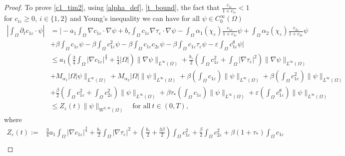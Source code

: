 \documentclass[a4paper,10pt]{article}
\theoremstyle{definition}
\begin{document}
\begin{proof}
  \noindent
  To prove \eqref{c1_tim2}, using \eqref{alpha_def}, \eqref{t_bound}, the fact that $\frac{c_{i\varepsilon}}{1 + c_{i\varepsilon}} < 1$ for $c_{i\varepsilon} \geq 0,\ i \in \{1, 2\}$ and Young's inequality we can have for all $\psi \in C_0^\infty(\Omega)$
  \begin{align}
  \label{c1_tim5}
    \nonumber \left|\int_\Omega \partial_t c_{1\varepsilon} \cdot \psi\right| & = \bigg| - a_1 \int_\Omega \nabla c_{1\varepsilon} \cdot \nabla \psi + b_\tau \int_\Omega c_{1\varepsilon} \nabla \tau_\varepsilon \cdot \nabla \psi  - \int_\Omega \alpha_1(\chi_\varepsilon)\tfrac{c_{1\varepsilon}}{1 + c_{1\varepsilon}}  \psi + \int_\Omega \alpha_2( \chi_\varepsilon) \tfrac{c_{2\varepsilon}}{1 + c_{2\varepsilon}} \psi \\[5pt]
    \nonumber &   + \beta \int_\Omega  c_{1\varepsilon}\psi -  \beta \int_\Omega  c_{1\varepsilon}^2\psi - \beta \int_\Omega  c_{1\varepsilon}   c_{2\varepsilon}\psi  - \beta \int_\Omega  c_{1\varepsilon} \tau_\varepsilon\psi  - \varepsilon \int_\Omega  c_{1\varepsilon}^\theta \psi \bigg|\\[5pt]
    \nonumber & \leq a_1 \left(\frac{3}{4} \int_\Omega |\nabla c_{1\varepsilon}|^{\frac{4}{3}} + \frac{1}{4} |\Omega|\right)\|\nabla \psi\|_{L^\infty(\Omega)} + \frac{b_\tau}{2} \left(\int_\Omega c_{1\varepsilon}^2 + \int_\Omega |\nabla \tau_\varepsilon|^2\right)\|\nabla \psi\|_{L^\infty(\Omega)} \\[5pt]
    \nonumber & + M_{\alpha_1} |\Omega| \psi\|_{L^\infty(\Omega)} +  M_{\alpha_2} |\Omega| \| \psi\|_{L^\infty(\Omega)}  + \beta \left(\int_\Omega c_{1\varepsilon}\right)\| \psi\|_{L^\infty(\Omega)}+ \beta \left(\int_\Omega c_{1\varepsilon}^2\right)\| \psi\|_{L^\infty(\Omega)} \\[5pt]
    \nonumber &   + \frac{\beta}{2} \left(\int_\Omega c_{1\varepsilon}^2 + \int_\Omega c_{2\varepsilon}^2\right)\| \psi\|_{L^\infty(\Omega)} + \beta \tau_\ast \left(\int_\Omega c_{1\varepsilon}\right)\| \psi\|_{L^\infty(\Omega)} + \varepsilon \left(\int_\Omega c_{1\varepsilon}^\theta\right)\| \psi\|_{L^\infty(\Omega)} \\[5pt]
    & \leq Z_\varepsilon(t) \|\psi\|_{W^{2, \infty}(\Omega)} \quad \text{for all} ~ t \in (0, T),
  \end{align}
  where
  \begin{align*}
    Z_\varepsilon(t) := & \frac{3}{4} a_1 \int_\Omega |\nabla c_{1\varepsilon}|^{\frac{4}{3}} + \frac{b_\tau}{2} \int_\Omega |\nabla \tau_\varepsilon|^{2} + \left(\frac{b_\tau}{2} + \frac{3\beta}{2}\right) \int_\Omega c_{1\varepsilon}^2 + \frac{\beta}{2} \int_\Omega c_{2\varepsilon}^2  + \beta(1 + \tau_\ast) \int_\Omega c_{1\varepsilon} \\[5pt]

\end{align*}
\end{proof}
\end{document}
